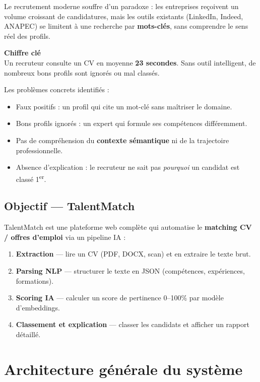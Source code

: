 \documentclass[12pt,a4paper]{report}
\newenvironment{infobox}[1][]{%
  \begin{framed}\noindent\textbf{\textcolor{navyblue}{#1}}\\[2pt]%
}{\end{framed}}
\begin{document}
Le recrutement moderne souffre d'un paradoxe : les entreprises reçoivent un
volume croissant de candidatures, mais les outils existants (LinkedIn, Indeed,
ANAPEC) se limitent à une recherche par \textbf{mots-clés}, sans comprendre
le sens réel des profils.

\begin{infobox}[Chiffre clé]
Un recruteur consulte un CV en moyenne \textbf{23 secondes}. Sans outil
intelligent, de nombreux bons profils sont ignorés ou mal classés.
\end{infobox}

Les problèmes concrets identifiés :
\begin{itemize}
  \item Faux positifs : un profil qui cite un mot-clé sans maîtriser le domaine.
  \item Bons profils ignorés : un expert qui formule ses compétences différemment.
  \item Pas de compréhension du \textbf{contexte sémantique} ni de la trajectoire professionnelle.
  \item Absence d'explication : le recruteur ne sait pas \textit{pourquoi} un candidat est classé 1\textsuperscript{er}.
\end{itemize}

\section{Objectif — TalentMatch}

TalentMatch est une plateforme web complète qui automatise le \textbf{matching CV / offres d'emploi}
via un pipeline IA :

\begin{enumerate}
  \item \textbf{Extraction} — lire un CV (PDF, DOCX, scan) et en extraire le texte brut.
  \item \textbf{Parsing NLP} — structurer le texte en JSON (compétences, expériences, formations).
  \item \textbf{Scoring IA} — calculer un score de pertinence 0–100\% par modèle d'embeddings.
  \item \textbf{Classement et explication} — classer les candidats et afficher un rapport détaillé.
\end{enumerate}

\chapter{Architecture générale du système}
\end{document}
